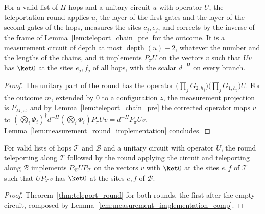 \begin{theorem}
    \label{thm:teleport_round}
    \leanok
    For a valid list of $H$ hops and a unitary circuit $u$ with operator $U$,
    the teleportation round applies $u$, the layer of the first gates and the
    layer of the second gates of the hops, measures the sites $c_j,e_j$, and
    corrects by the inverse of the frame of Lemma~\ref{lem:teleport_chain_pre}
    for the outcome. It is a measurement circuit of depth at most
    $\operatorname{depth}(u)+2$, whatever the number and the lengths of the
    chains, and it implements $P_\pi U$ on the vectors $v$ such that $Uv$ has
    $\ket0$ at the sites $e_j,f_j$ of all hops, with the scalar $d^{-H}$ on
    every branch.
\end{theorem}
\begin{proof}
    \leanok
    The unitary part of the round has the operator
    $\bigl(\prod_jG_{2,h_j}\bigr)\bigl(\prod_jG_{1,h_j}\bigr)U$. For the
    outcome $m$, extended by $0$ to a configuration $z$, the measurement
    projection is $P_{M,z}$, and by Lemma~\ref{lem:teleport_chain_pre} the
    corrected operator maps $v$ to
    $(\bigotimes_i\Phi_i)^\dagger d^{-H}(\bigotimes_i\Phi_i)P_\pi Uv=d^{-H}P_\pi
        Uv$. Lemma~\ref{lem:measurement_round_implementation} concludes.
\end{proof}

\begin{lemma}
    \label{lem:teleport_conjugated}
    \leanok
    For valid lists of hops $\mathcal T$ and $\mathcal B$ and a unitary circuit
    with operator $U$, the round teleporting along $\mathcal T$ followed by
    the round applying the circuit and teleporting along $\mathcal B$
    implements $P_{\mathcal B}UP_{\mathcal T}$ on the vectors $v$ with $\ket0$
    at the sites $e,f$ of $\mathcal T$ such that $UP_{\mathcal T}v$ has $\ket0$
    at the sites $e,f$ of $\mathcal B$.
\end{lemma}
\begin{proof}
    \leanok
    Theorem~\ref{thm:teleport_round} for both rounds, the first after the empty
    circuit, composed by Lemma~\ref{lem:measurement_implementation_comp}.
\end{proof}

